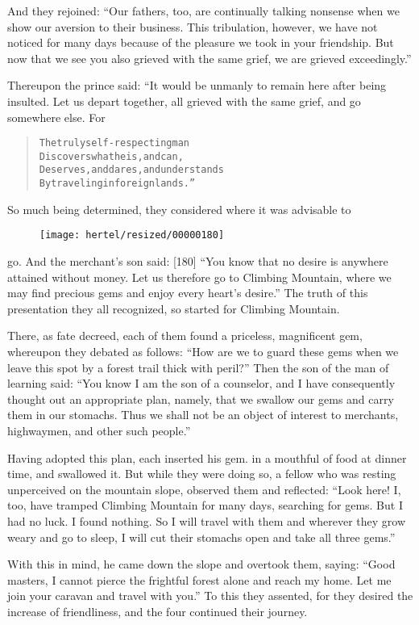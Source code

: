 \documentclass[article, twoside, 10pt]{memoir}
\renewenvironment{verbatim}{%
\begin{quote}%
\vskip -10pt%
\begin{alltt}\normalfont\small}{\end{alltt}%
\end{quote}%
\vskip -10pt
} %
\begin{document}
And they rejoined:
``Our fathers, too, are continually talking nonsense when we show our aversion to their business. This tribulation, however, we have not noticed for many days because of the pleasure we took in your friendship. But now that we see you also grieved with the same grief, we are grieved exceedingly.''

Thereupon the prince said: “It would be unmanly to remain here
after being insulted. Let us depart together, all grieved with the
same grief, and go somewhere else. For

\begin{verbatim}
The truly self-respecting man
Discovers what he is, and can,
Deserves, and dares, and understands
By traveling in foreign lands.”
\end{verbatim}
So much being determined, they considered where it was advisable to
\begin{figure}[p]\texttt{[image: hertel/resized/00000180]}\end{figure}go. And the merchant's son said: [180]
``You know that no desire is anywhere attained without money. Let us therefore go to Climbing Mountain, where we may find precious gems and enjoy every heart's desire.''
The truth of this presentation they all recognized, so started for
Climbing Mountain.

There, as fate decreed, each of them found a priceless, magnificent
gem, whereupon they debated as follows:
``How are we to guard these gems when we leave this spot by a forest trail thick with peril?''
Then the son of the man of learning said:
``You know I am the son of a counselor, and I have consequently thought out an appropriate plan, namely, that we swallow our gems and carry them in our stomachs. Thus we shall not be an object of interest to merchants, highwaymen, and other such people.''

Having adopted this plan, each inserted his gem. in a mouthful of
food at dinner time, and swallowed it. But while they were doing
so, a fellow who was resting unperceived on the mountain slope,
observed them and reflected:
``Look here! I, too, have tramped Climbing Mountain for many days, searching for gems. But I had no luck. I found nothing. So I will travel with them and wherever they grow weary and go to sleep, I will cut their stomachs open and take all three gems.''

With this in mind, he came down the slope and overtook them,
saying:
``Good masters, I cannot pierce the frightful forest alone and reach my home. Let me join your caravan and travel with you.''
To this they assented, for they desired the increase of
friendliness, and the four continued their journey.
\end{document}
